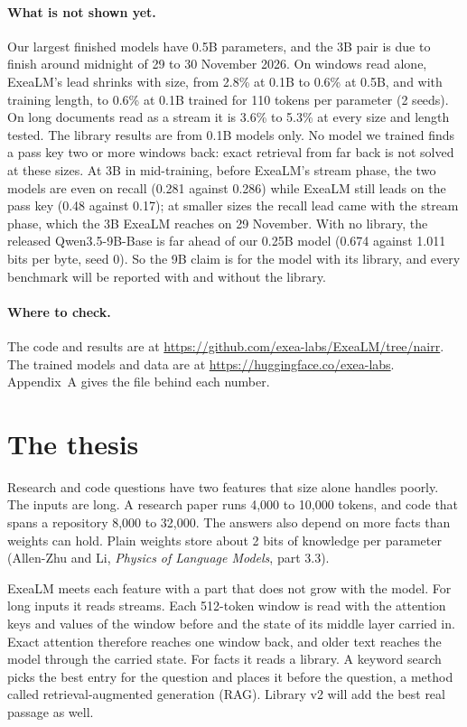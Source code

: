 \documentclass[11pt,letterpaper]{article}
\begin{document}
\paragraph{What is not shown yet.}
Our largest finished models have 0.5B parameters, and the 3B pair is due to finish around midnight of 29 to 30 November 2026.
On windows read alone, ExeaLM's lead shrinks with size, from 2.8\% at 0.1B to 0.6\% at 0.5B, and with training length, to 0.6\% at 0.1B trained for 110 tokens per parameter (2 seeds). On long documents read as a stream it is 3.6\% to 5.3\% at every size and length tested.
The library results are from 0.1B models only.
No model we trained finds a pass key two or more windows back: exact retrieval from far back is not solved at these sizes.
At 3B in mid-training, before ExeaLM's stream phase, the two models are even on recall (0.281 against 0.286) while ExeaLM still leads on the pass key (0.48 against 0.17); at smaller sizes the recall lead came with the stream phase, which the 3B ExeaLM reaches on 29 November.
With no library, the released Qwen3.5-9B-Base is far ahead of our 0.25B model (0.674 against 1.011 bits per byte, seed 0).
So the 9B claim is for the model with its library, and every benchmark will be reported with and without the library.

\paragraph{Where to check.}
The code and results are at \url{https://github.com/exea-labs/ExeaLM/tree/nairr}.
The trained models and data are at \url{https://huggingface.co/exea-labs}.
Appendix~A gives the file behind each number.

\newpage
\section{The thesis}

Research and code questions have two features that size alone handles poorly.
The inputs are long.
A research paper runs 4,000 to 10,000 tokens, and code that spans a repository 8,000 to 32,000.
The answers also depend on more facts than weights can hold.
Plain weights store about 2 bits of knowledge per parameter (Allen-Zhu and Li, \emph{Physics of Language Models}, part 3.3).

ExeaLM meets each feature with a part that does not grow with the model.
For long inputs it reads streams.
Each 512-token window is read with the attention keys and values of the window before and the state of its middle layer carried in.
Exact attention therefore reaches one window back, and older text reaches the model through the carried state.
For facts it reads a library.
A keyword search picks the best entry for the question and places it before the question, a method called retrieval-augmented generation (RAG).
Library v2 will add the best real passage as well.
\end{document}
